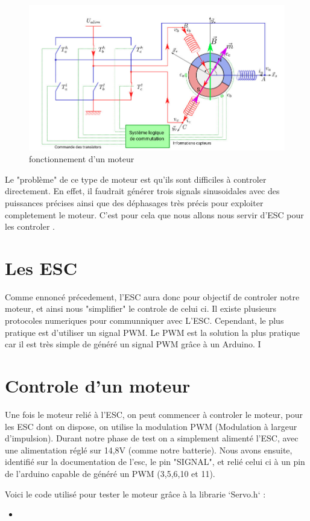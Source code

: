 \documentclass[10pt,a4paper]{article}
\newcommand{\insertcode}[2]{\begin{itemize}\item[]\end{itemize}}
\begin{document}
\begin{figure}[h!]
\centering
\includegraphics[scale=0.250]{image/1.jpg}
\caption{fonctionnement d'un moteur}
\label{fig:net }
\end{figure}
Le "problème" de ce type de moteur est qu'ils sont difficiles à controler directement. En effet, il faudrait générer trois signals sinusoidales avec des puissances précises ainsi que des déphasages très précis pour exploiter completement le moteur. C'est pour cela que nous allons nous servir d'ESC pour les controler .

\section{Les ESC}
 Comme ennoncé précedement, l'ESC aura donc pour objectif de controler notre moteur, et ainsi nous "simplifier" le controle de celui ci. Il existe plusieurs protocoles numeriques pour communniquer avec L'ESC. Cependant, le plus pratique est d'utiliser un signal PWM. Le PWM est la solution la plus pratique car il est très simple de généré un signal PWM grâce à un Arduino. I
\section{Controle d'un moteur}
Une fois le moteur relié à l'ESC, on peut commencer à controler le moteur, pour les ESC dont on dispose, on utilise la modulation PWM (Modulation à largeur d'impulsion). Durant notre phase de test on a simplement alimenté l'ESC, avec une alimentation réglé sur 14,8V (comme notre batterie). Nous avons ensuite, identifié sur la documentation de l'esc, le pin "SIGNAL", et relié celui ci à un pin de l'arduino capable de généré un PWM (3,5,6,10 et 11). 

Voici le code utilisé pour tester le moteur grâce à la librarie `Servo.h` :
\insertcode{code/1.ino}{Code basique pour controller des moteurs}
\end{document}
